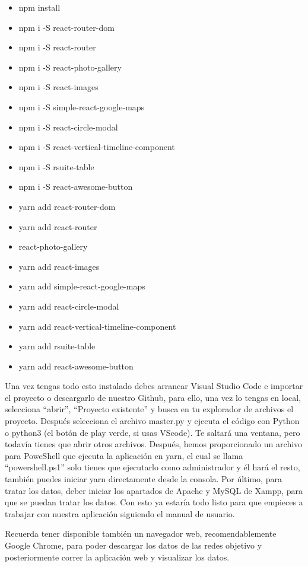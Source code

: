 \begin{itemize}
	\item npm install
	\item npm i -S react-router-dom
	\item npm i -S react-router
	\item npm i -S react-photo-gallery
	\item npm i -S react-images
	\item npm i -S simple-react-google-maps
	\item npm i -S react-circle-modal
	\item npm i -S react-vertical-timeline-component
	\item npm i -S rsuite-table
	\item npm i -S react-awesome-button
	\item yarn add react-router-dom
	\item yarn add react-router
	\item react-photo-gallery
	\item yarn add react-images
	\item yarn add simple-react-google-maps
	\item yarn add react-circle-modal
	\item yarn add react-vertical-timeline-component
	\item yarn add rsuite-table
	\item yarn add react-awesome-button
\end{itemize}

 Una vez tengas todo esto instalado debes arrancar Visual Studio Code e importar el proyecto o descargarlo de nuestro Github, para ello, una vez lo tengas en local, selecciona ``abrir'', ``Proyecto existente'' y busca en tu explorador de archivos el proyecto. Después selecciona el archivo master.py y ejecuta el código con Python o python3 (el botón de play verde, si usas VScode). Te saltará una ventana, pero todavía tienes que abrir otros archivos. Después, hemos proporcionado un archivo para PoweShell que ejecuta la aplicación en yarn, el cual se llama ``powershell.ps1'' solo tienes que ejecutarlo como administrador y él hará el resto, también puedes iniciar yarn directamente desde la consola. Por último, para tratar los datos, deber iniciar los apartados de Apache y MySQL de Xampp, para que se puedan tratar los datos. Con esto ya estaría todo listo para que empieces a trabajar con nuestra aplicación siguiendo el manual de usuario.
 
 Recuerda tener disponible también un navegador web, recomendablemente Google Chrome, para poder descargar los datos de las redes objetivo y posteriormente correr la aplicación web y visualizar los datos.

